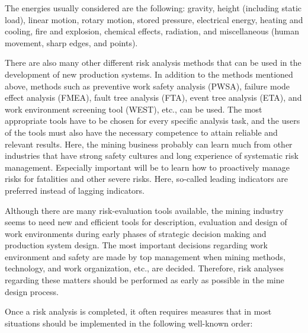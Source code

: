 \documentclass[
  12pt,
]{scrbook}
\begin{document}
The energies usually considered are the following: gravity, height (including static load), linear motion, rotary motion, stored pressure, electrical energy, heating and cooling, fire and explosion, chemical effects, radiation, and miscellaneous (human movement, sharp edges, and points).

There are also many other different risk analysis methods that can be used in the development of new production systems. In addition to the methods mentioned above, methods such as preventive work safety analysis (PWSA), failure mode effect analysis (FMEA), fault tree analysis (FTA), event tree analysis (ETA), and work environment screening tool (WEST), etc., can be used. The most appropriate tools have to be chosen for every specific analysis task, and the users of the tools must also have the necessary competence to attain reliable and relevant results. Here, the mining business probably can learn much from other industries that have strong safety cultures and long experience of systematic risk management. Especially important will be to learn how to proactively manage risks for fatalities and other severe risks. Here, so-called leading indicators are preferred instead of lagging indicators.

Although there are many risk-evaluation tools available, the mining industry seems to need new and efficient tools for description, evaluation and design of work environments during early phases of strategic decision making and production system design. The most important decisions regarding work environment and safety are made by top management when mining methods, technology, and work organization, etc., are decided. Therefore, risk analyses regarding these matters should be performed as early as possible in the mine design process.

Once a risk analysis is completed, it often requires measures that in most situations should be implemented in the following well-known order:
\end{document}
